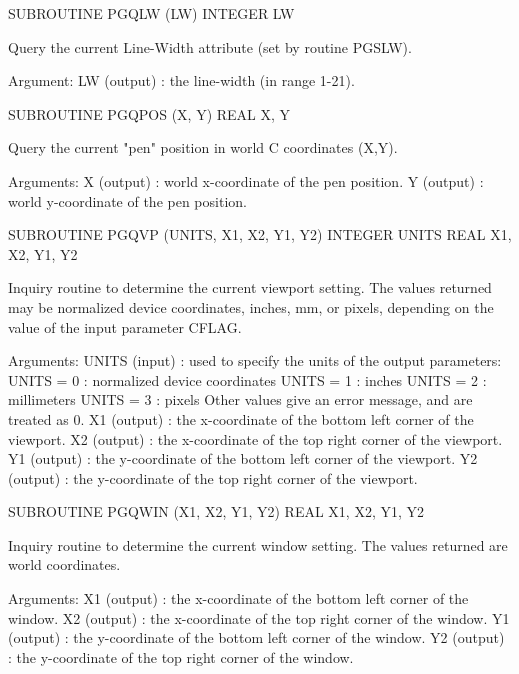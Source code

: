 {\eightpoint\begintt
      SUBROUTINE PGQLW (LW)
      INTEGER  LW
 
Query the current Line-Width attribute (set by routine PGSLW).
 
Argument:
 LW     (output)  : the line-width (in range 1-21).
\endtt}

{\eightpoint\begintt
      SUBROUTINE PGQPOS (X, Y)
      REAL X, Y
 
Query the current "pen" position in world C coordinates (X,Y).
 
Arguments:
 X      (output)  : world x-coordinate of the pen position.
 Y      (output)  : world y-coordinate of the pen position.
\endtt}

{\eightpoint\begintt
      SUBROUTINE PGQVP (UNITS, X1, X2, Y1, Y2)
      INTEGER UNITS
      REAL    X1, X2, Y1, Y2
 
Inquiry routine to determine the current viewport setting.
The values returned may be normalized device coordinates, inches, mm,
or pixels, depending on the value of the input parameter CFLAG.
 
Arguments:
 UNITS  (input)  : used to specify the units of the output parameters:
                   UNITS = 0 : normalized device coordinates
                   UNITS = 1 : inches
                   UNITS = 2 : millimeters
                   UNITS = 3 : pixels
                   Other values give an error message, and are
                   treated as 0.
 X1     (output) : the x-coordinate of the bottom left corner of the
                   viewport.
 X2     (output) : the x-coordinate of the top right corner of the
                   viewport.
 Y1     (output) : the y-coordinate of the bottom left corner of the
                   viewport.
 Y2     (output) : the y-coordinate of the top right corner of the
                   viewport.
\endtt}

{\eightpoint\begintt
      SUBROUTINE PGQWIN (X1, X2, Y1, Y2)
      REAL X1, X2, Y1, Y2
 
Inquiry routine to determine the current window setting.
The values returned are world coordinates.
 
Arguments:
 X1     (output) : the x-coordinate of the bottom left corner
                   of the window.
 X2     (output) : the x-coordinate of the top right corner
                   of the window.
 Y1     (output) : the y-coordinate of the bottom left corner
                   of the window.
 Y2     (output) : the y-coordinate of the top right corner
                   of the window.
\endtt}

